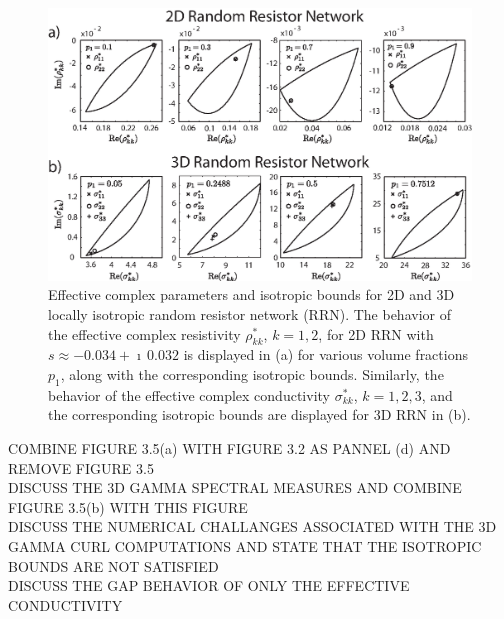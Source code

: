 \documentclass{cmslatex}
\begin{document}
%
\begin{figure}[t]
  \centerline{\includegraphics[scale=0.65]{2D_GammaCurl_and_3D_Gamma_Bounds.eps}} 
\caption{Effective complex parameters and isotropic bounds for 2D and
  3D locally isotropic random resistor network (RRN). The behavior of
  the effective complex resistivity $\rho^*_{kk}$, $k=1,2$, for 2D RRN
  with $s\approx-0.034+\imath\,0.032$ is displayed in (a) for various volume
  fractions $p_1$, along with the corresponding isotropic
  bounds. Similarly, the behavior of the effective complex
  conductivity $\sigma^*_{kk}$, $k=1,2,3$, and the corresponding isotropic
  bounds are displayed for 3D RRN in (b). 
        }
\label{fig:3D_and_3D_Bounds}
\end{figure}
%


\newpage\noindent
COMBINE FIGURE 3.5(a) WITH FIGURE 3.2 AS PANNEL (d) AND REMOVE FIGURE 3.5\\
DISCUSS THE 3D GAMMA SPECTRAL MEASURES AND COMBINE FIGURE 3.5(b) WITH
THIS FIGURE\\
DISCUSS THE NUMERICAL CHALLANGES ASSOCIATED WITH THE 3D GAMMA CURL
COMPUTATIONS AND STATE THAT THE ISOTROPIC BOUNDS ARE NOT SATISFIED\\ 
DISCUSS THE GAP BEHAVIOR OF ONLY THE EFFECTIVE CONDUCTIVITY
\newpage
\end{document}

